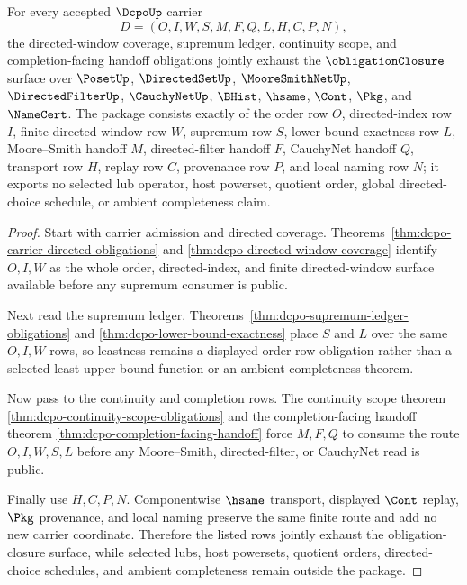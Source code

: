 \begin{theorem}
\label{thm:dcpo-obligation-closure-package}
For every accepted $\DcpoUp$ carrier
$$
D=(O,I,W,S,M,F,Q,L,H,C,P,N),
$$
the directed-window coverage, supremum ledger, continuity scope, and completion-facing handoff obligations jointly exhaust the $\obligationClosure$ surface over $\PosetUp$, $\DirectedSetUp$, $\MooreSmithNetUp$, $\DirectedFilterUp$, $\CauchyNetUp$, $\BHist$, $\hsame$, $\Cont$, $\Pkg$, and $\NameCert$. The package consists exactly of the order row $O$, directed-index row $I$, finite directed-window row $W$, supremum row $S$, lower-bound exactness row $L$, Moore--Smith handoff $M$, directed-filter handoff $F$, CauchyNet handoff $Q$, transport row $H$, replay row $C$, provenance row $P$, and local naming row $N$; it exports no selected lub operator, host powerset, quotient order, global directed-choice schedule, or ambient completeness claim.
\end{theorem}
\begin{proof}
Start with carrier admission and directed coverage. Theorems~\ref{thm:dcpo-carrier-directed-obligations} and \ref{thm:dcpo-directed-window-coverage} identify $O,I,W$ as the whole order, directed-index, and finite directed-window surface available before any supremum consumer is public.

Next read the supremum ledger. Theorems~\ref{thm:dcpo-supremum-ledger-obligations} and \ref{thm:dcpo-lower-bound-exactness} place $S$ and $L$ over the same $O,I,W$ rows, so leastness remains a displayed order-row obligation rather than a selected least-upper-bound function or an ambient completeness theorem.

Now pass to the continuity and completion rows. The continuity scope theorem \autoref{thm:dcpo-continuity-scope-obligations} and the completion-facing handoff theorem \autoref{thm:dcpo-completion-facing-handoff} force $M,F,Q$ to consume the route $O,I,W,S,L$ before any Moore--Smith, directed-filter, or CauchyNet read is public.

Finally use $H,C,P,N$. Componentwise $\hsame$ transport, displayed $\Cont$ replay, $\Pkg$ provenance, and local naming preserve the same finite route and add no new carrier coordinate. Therefore the listed rows jointly exhaust the obligation-closure surface, while selected lubs, host powersets, quotient orders, directed-choice schedules, and ambient completeness remain outside the package.
\end{proof}

